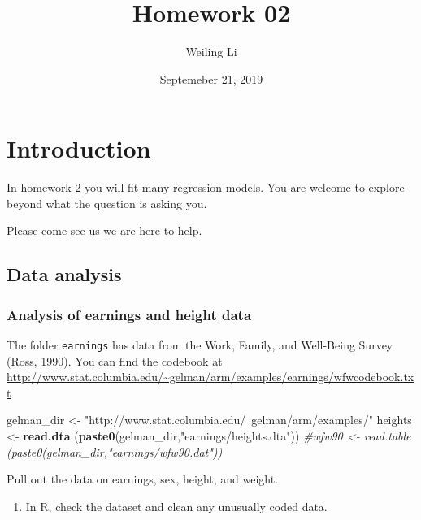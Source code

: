 \documentclass[]{article}
\title{Homework 02}
\author{Weiling Li}
\date{Septemeber 21, 2019}
\newenvironment{Shaded}{\begin{snugshade}}{\end{snugshade}}
\newcommand{\CommentTok}[1]{\textcolor[rgb]{0.56,0.35,0.01}{\textit{#1}}}
\newcommand{\KeywordTok}[1]{\textcolor[rgb]{0.13,0.29,0.53}{\textbf{#1}}}
\newcommand{\NormalTok}[1]{#1}
\newcommand{\StringTok}[1]{\textcolor[rgb]{0.31,0.60,0.02}{#1}}
\providecommand{\tightlist}{%
  \setlength{\itemsep}{0pt}\setlength{\parskip}{0pt}}
\begin{document}
\maketitle

\newcommand{\mat}[1]{\boldsymbol{#1}} 
\newcommand{\norm}[1]{\left\lVert#1\right\rVert}
\newcommand{\rv}[1]{\underline{#1}}

\hypertarget{introduction}{%
\section{Introduction}\label{introduction}}

In homework 2 you will fit many regression models. You are welcome to
explore beyond what the question is asking you.

Please come see us we are here to help.

\hypertarget{data-analysis}{%
\subsection{Data analysis}\label{data-analysis}}

\hypertarget{analysis-of-earnings-and-height-data}{%
\subsubsection{Analysis of earnings and height
data}\label{analysis-of-earnings-and-height-data}}

The folder \texttt{earnings} has data from the Work, Family, and
Well-Being Survey (Ross, 1990). You can find the codebook at
\url{http://www.stat.columbia.edu/~gelman/arm/examples/earnings/wfwcodebook.txt}

\begin{Shaded}
\begin{Highlighting}[]
\NormalTok{gelman_dir <-}\StringTok{ "http://www.stat.columbia.edu/~gelman/arm/examples/"}
\NormalTok{heights    <-}\StringTok{ }\KeywordTok{read.dta}\NormalTok{ (}\KeywordTok{paste0}\NormalTok{(gelman_dir,}\StringTok{"earnings/heights.dta"}\NormalTok{))}
\CommentTok{#wfw90    <- read.table (paste0(gelman_dir,"earnings/wfw90.dat"))}
\end{Highlighting}
\end{Shaded}

Pull out the data on earnings, sex, height, and weight.

\begin{enumerate}
\def\labelenumi{\arabic{enumi}.}
\tightlist
\item
  In R, check the dataset and clean any unusually coded data.
\end{enumerate}
\end{document}

